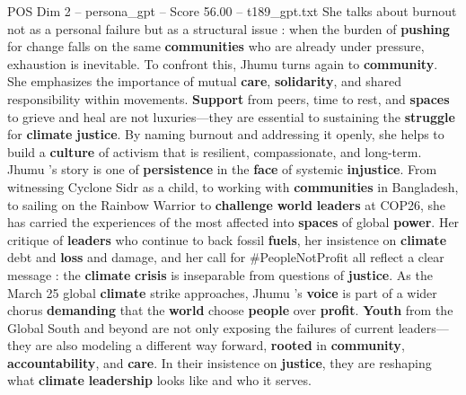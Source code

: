 \begin{textsample}{POS Dim 2 – persona\_gpt – Score 56.00 – t189\_gpt.txt}
She talks about burnout not as a personal failure but as a structural issue : when the burden of \textbf{pushing} for change falls on the same \textbf{communities} who are already under pressure, exhaustion is inevitable.
To confront this, Jhumu turns again to \textbf{community}.
She emphasizes the importance of mutual \textbf{care}, \textbf{solidarity}, and shared responsibility within movements. \textbf{Support} from peers, time to rest, and \textbf{spaces} to grieve and heal are not luxuries—they are essential to sustaining the \textbf{struggle} for \textbf{climate} \textbf{justice}.
By naming burnout and addressing it openly, she helps to build a \textbf{culture} of activism that is resilient, compassionate, and long-term.
Jhumu ’s story is one of \textbf{persistence} in the \textbf{face} of systemic \textbf{injustice}.
From witnessing Cyclone Sidr as a child, to working with \textbf{communities} in Bangladesh, to sailing on the Rainbow Warrior to \textbf{challenge} \textbf{world} \textbf{leaders} at COP26, she has carried the experiences of the most affected into \textbf{spaces} of global \textbf{power}.
Her critique of \textbf{leaders} who continue to back fossil \textbf{fuels}, her insistence on \textbf{climate} debt and \textbf{loss} and damage, and her call for \#PeopleNotProfit all reflect a clear message : the \textbf{climate} \textbf{crisis} is inseparable from questions of \textbf{justice}.
As the March 25 global \textbf{climate} strike approaches, Jhumu ’s \textbf{voice} is part of a wider chorus \textbf{demanding} that the \textbf{world} choose \textbf{people} over \textbf{profit}. \textbf{Youth} from the Global South and beyond are not only exposing the failures of current leaders—they are also modeling a different way forward, \textbf{rooted} in \textbf{community}, \textbf{accountability}, and \textbf{care}.
In their insistence on \textbf{justice}, they are reshaping what \textbf{climate} \textbf{leadership} looks like and who it serves.

\end{textsample}
